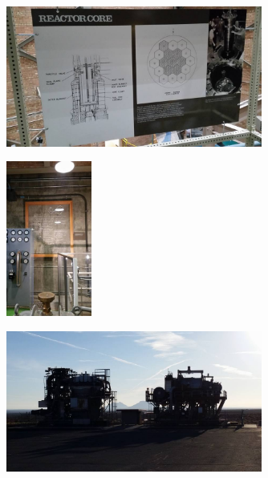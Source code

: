 \documentclass[aspectratio=1610,pdftex,dvipsnames,compress,xcolor={dvipsnames}]{beamer}
\begin{document}
\begin{frame}{}
    \begin{figure}
        \centering
        \includegraphics[width=0.75\textwidth]{ebr10.jpg}
    \end{figure}
\end{frame}


\begin{frame}{}
    \begin{figure}
        \centering
        \includegraphics[width=0.25\textwidth]{ebr11.jpg}
    \end{figure}
\end{frame}


\begin{frame}{}
    \begin{figure}
        \centering
        \includegraphics[width=0.75\textwidth]{ebr12.jpg}
    \end{figure}
\end{frame}
\end{document}
